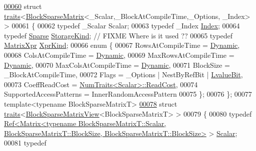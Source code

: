 \begin{DoxyCode}
\hyperlink{struct_eigen_1_1internal_1_1traits_3_01_block_sparse_matrix_3_01___scalar_00_01___block_at_compibd5ca3edcdbc62bf01222bcf3326c5bd}{00060} \textcolor{keyword}{struct }\hyperlink{struct_eigen_1_1internal_1_1traits}{traits}<\hyperlink{group___sparse_core___module_class_eigen_1_1_block_sparse_matrix}{BlockSparseMatrix}<\_Scalar,\_BlockAtCompileTime,\_Options, \_Index> >
00061 \{
00062   \textcolor{keyword}{typedef} \_Scalar Scalar;
00063   \textcolor{keyword}{typedef} \_Index \hyperlink{namespace_eigen_a62e77e0933482dafde8fe197d9a2cfde}{Index};
00064   \textcolor{keyword}{typedef} \hyperlink{struct_eigen_1_1_sparse}{Sparse} \hyperlink{struct_eigen_1_1_sparse}{StorageKind}; \textcolor{comment}{// FIXME Where is it used ??}
00065   \textcolor{keyword}{typedef} \hyperlink{struct_eigen_1_1_matrix_xpr}{MatrixXpr} \hyperlink{struct_eigen_1_1_matrix_xpr}{XprKind};
00066   \textcolor{keyword}{enum} \{
00067     RowsAtCompileTime = \hyperlink{namespace_eigen_ad81fa7195215a0ce30017dfac309f0b2}{Dynamic},
00068     ColsAtCompileTime = \hyperlink{namespace_eigen_ad81fa7195215a0ce30017dfac309f0b2}{Dynamic},
00069     MaxRowsAtCompileTime = \hyperlink{namespace_eigen_ad81fa7195215a0ce30017dfac309f0b2}{Dynamic},
00070     MaxColsAtCompileTime = \hyperlink{namespace_eigen_ad81fa7195215a0ce30017dfac309f0b2}{Dynamic},
00071     BlockSize = \_BlockAtCompileTime,
00072     Flags = \_Options | NestByRefBit | \hyperlink{group__flags_gae2c323957f20dfdc6cb8f44428eaec1a}{LvalueBit},
00073     CoeffReadCost = \hyperlink{group___core___module_struct_eigen_1_1_num_traits}{NumTraits<Scalar>::ReadCost},
00074     SupportedAccessPatterns = InnerRandomAccessPattern
00075   \};
00076 \};
00077 \textcolor{keyword}{template}<\textcolor{keyword}{typename} BlockSparseMatrixT>
\hyperlink{struct_eigen_1_1internal_1_1traits_3_01_block_sparse_matrix_view_3_01_block_sparse_matrix_t_01_4_01_4}{00078} \textcolor{keyword}{struct }\hyperlink{struct_eigen_1_1internal_1_1traits}{traits}<\hyperlink{class_eigen_1_1_block_sparse_matrix_view}{BlockSparseMatrixView}<BlockSparseMatrixT> >
00079 \{
00080   \textcolor{keyword}{typedef} 
      \hyperlink{group___core___module_class_eigen_1_1_ref}{Ref<Matrix<typename BlockSparseMatrixT::Scalar, BlockSparseMatrixT::BlockSize,
       BlockSparseMatrixT::BlockSize>}
       > \hyperlink{group___core___module_class_eigen_1_1_ref}{Scalar};
00081   \textcolor{keyword}{typedef} 

\end{DoxyCode}
